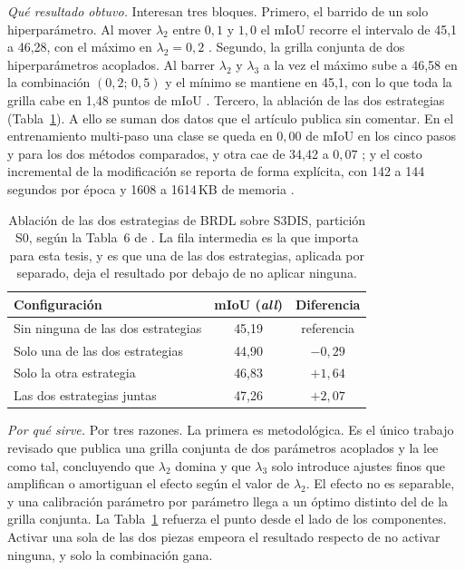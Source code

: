 \emph{Qué resultado obtuvo.} Interesan tres bloques. Primero, el barrido de un
solo hiperparámetro. Al mover $\lambda_2$ entre $0{,}1$ y $1{,}0$ el mIoU recorre
el intervalo de 45,1 a 46,28, con el máximo en
$\lambda_2=0{,}2$ \cite[Tabla~3]{su2025brdl}. Segundo, la grilla conjunta de dos
hiperparámetros acoplados. Al barrer $\lambda_2$ y $\lambda_3$ a la vez el máximo
sube a 46,58 en la combinación $(0{,}2;\,0{,}5)$ y el mínimo se mantiene en 45,1,
con lo que toda la grilla cabe en 1,48 puntos de mIoU \cite[Tabla~4]{su2025brdl}. Tercero, la ablación de las dos estrategias
(Tabla~\ref{tab:ablacion-brdl}). A ello
se suman dos datos que el artículo publica sin comentar. En el entrenamiento
multi-paso una clase se queda en $0{,}00$ de mIoU en los cinco pasos y para los
dos métodos comparados, y otra cae de 34,42 a $0{,}07$ \cite[Tabla~5]{su2025brdl}; y el costo incremental de la modificación se reporta de forma
explícita, con 142 a 144 segundos por época y 1608 a 1614\,KB de
memoria \cite[Tabla~8]{su2025brdl}.

\begin{table}[!htbp]
\centering
{}\small
\caption[Ablación de BRDL en S3DIS]{Ablación de las dos estrategias de BRDL sobre S3DIS, partición S0,
según la Tabla~6 de \cite{su2025brdl}. La fila intermedia es la que importa para
esta tesis, y es que una de las dos estrategias, aplicada por separado, deja el resultado
por debajo de no aplicar ninguna.}
\label{tab:ablacion-brdl}
\begin{tabularx}{\linewidth}{@{}>{\raggedright\arraybackslash\hsize=1.00\hsize}Xcc@{}}
\hline
Configuración & mIoU (\emph{all}) & Diferencia \\
\hline
Sin ninguna de las dos estrategias & 45,19 & referencia \\
Solo una de las dos estrategias & 44,90 & $-0{,}29$ \\
Solo la otra estrategia & 46,83 & $+1{,}64$ \\
Las dos estrategias juntas & 47,26 & $+2{,}07$ \\
\hline
\end{tabularx}
\end{table}

\emph{Por qué sirve.} Por tres razones. La primera es metodológica. Es el único
trabajo revisado que publica una grilla conjunta de dos parámetros acoplados y la
lee como tal, concluyendo que $\lambda_2$ domina y que $\lambda_3$ solo introduce
ajustes finos que amplifican o amortiguan el efecto según el valor de
$\lambda_2$. El efecto no es separable, y una calibración parámetro por parámetro
llega a un óptimo distinto del de la grilla conjunta. La
Tabla~\ref{tab:ablacion-brdl} refuerza el punto desde el lado de los
componentes. Activar una sola de las dos piezas empeora el resultado respecto de
no activar ninguna, y solo la combinación gana.

